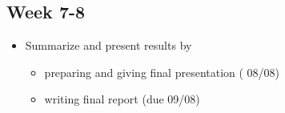 \documentclass{article}
\numberwithin{equation}{section}
\theoremstyle{definition}
\begin{document}

\subsection*{Week 7-8}
\begin{itemize}[noitemsep]
    \item Summarize and present results by
    \begin{itemize}
        \item preparing and giving final presentation ( 08/08)
        \item writing final report (due 09/08)
    \end{itemize}
\end{itemize}

\end{document}
